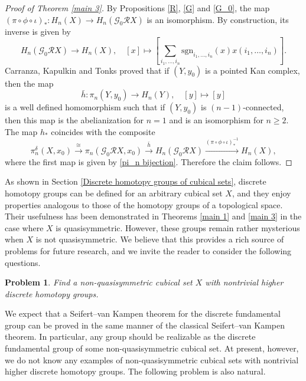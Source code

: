 \documentclass[oneside, 12pt]{amsart}
\numberwithin{equation}{section}
\theoremstyle{plain}
\newtheorem{problem}[theorem]{Problem}
\theoremstyle{definition}
\theoremstyle{remark}
\begin{document}
	\begin{proof}
		[Proof of Theorem \ref{main 3}]
		By Propositions \ref{R}, \ref{G} and \ref{G_0}, the map $(\pi\circ\phi\circ\iota)_*\colon H_n(X)\to H_n(\mathcal{G}_0\mathcal{R}X)$ is an isomorphism. By construction, its inverse is given by
		\[
		H_n(\mathcal{G}_0\mathcal{R}X)\to H_n(X),\quad[x]\mapsto\left[\sum_{i_1,\ldots,i_n}\mathrm{sgn}_{i_1,\ldots,i_n}(x)x(i_1,\ldots,i_n)\right].
		\]
		Carranza, Kapulkin and Tonks \cite{CKT} proved that if $(Y,y_0)$ is a pointed Kan complex, then the map
		\[
		\bar{h}\colon\pi_n(Y,y_0)\to H_n(Y),\quad[y]\mapsto[y]
		\]
		is a well defined homomorphism such that if $(Y,y_0)$ is $(n-1)$-connected, then this map is the abelianization for $n=1$ and is an isomorphism for $n\ge 2$. The map $h_*$ coincides with the composite
		\[
		\pi_n^\delta(X,x_0)\xrightarrow{\cong}\pi_n(\mathcal{G}_0\mathcal{R}X,x_0)\xrightarrow{\bar{h}}H_n(\mathcal{G}_0\mathcal{R}X)\xrightarrow{(\pi\circ\phi\circ\iota)_*^{-1}}H_n(X),
		\]
		where the first map is given by \eqref{pi_n bijection}. Therefore the claim follows. 
	\end{proof}


	
	
	
	As shown in Section \ref{Discrete homotopy groups of cubical sets}, discrete homotopy groups can be defined for an arbitrary cubical set \(X\), and they enjoy properties analogous to those of the homotopy groups of a topological space. Their usefulness has been demonstrated in Theorems \ref{main 1} and \ref{main 3} in the case where \(X\) is quasisymmetric. However, these groups remain rather mysterious when \(X\) is not quasisymmetric. We believe that this provides a rich source of problems for future research, and we invite the reader to consider the following questions.
	
	\begin{problem}
		Find a non-quasisymmetric cubical set \(X\) with nontrivial higher discrete homotopy groups.
	\end{problem}
	
	We expect that a Seifert--van Kampen theorem for the discrete fundamental group can be proved in the same manner of the classical Seifert--van Kampen theorem. In particular, any group should be realizable as the discrete fundamental group of some non-quasisymmetric cubical set. At present, however, we do not know any examples of non-quasisymmetric cubical sets with nontrivial higher discrete homotopy groups. The following problem is also natural.
	
\end{document}
